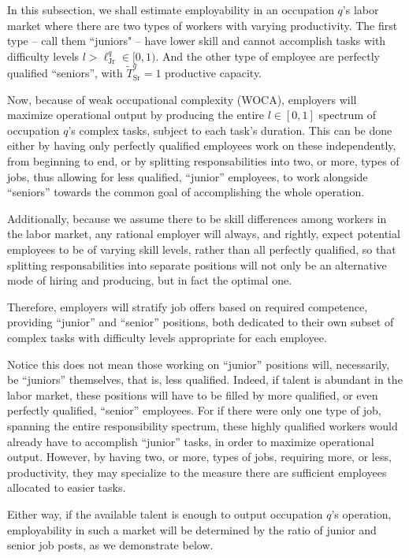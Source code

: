 \documentclass[hidelinks, nonatbib]{elsarticle}
\begin{document}
In this subsection, we shall estimate employability in an occupation $q$'s labor market where there are two types of workers with varying productivity. The first type -- call them ``juniors" -- have lower skill and cannot accomplish tasks with difficulty levels $l > \ell_{\text{Jr}}^{q} \in [0,1)$. And the other type of employee are perfectly qualified ``seniors'', with $\tilde{T}_{\text{Sr}}^{q} = 1$ productive capacity.

Now, because of weak occupational complexity (WOCA), employers will maximize operational output by producing the entire $l \in [0,1]$ spectrum of occupation $q$'s complex tasks, subject to each task's duration. This can be done either by having only perfectly qualified employees work on these independently, from beginning to end, or by splitting responsabilities into two, or more, types of jobs, thus allowing for less qualified, ``junior'' employees, to work alongside ``seniors'' towards the common goal of accomplishing the whole operation.

Additionally, because we assume there to be skill differences among workers in the labor market, any rational employer will always, and rightly, expect potential employees to be of varying skill levels, rather than all perfectly qualified, so that splitting responsabilities into separate positions will not only be an alternative mode of hiring and producing, but in fact the optimal one.

Therefore, employers will stratify job offers based on required competence, providing ``junior'' and ``senior'' positions, both dedicated to their own subset of complex tasks with difficulty levels appropriate for each employee.

Notice this does not mean those working on ``junior'' positions will, necessarily, be ``juniors'' themselves, that is, less qualified. Indeed, if talent is abundant in the labor market, these positions will have to be filled by more qualified, or even perfectly qualified, ``senior'' employees. For if there were only one type of job, spanning the entire responsibility spectrum, these highly qualified workers would already have to accomplish ``junior'' tasks, in order to maximize operational output. However, by having two, or more, types of jobs, requiring more, or less, productivity, they may specialize to the measure there are sufficient employees allocated to easier tasks.

Either way, if the available talent is enough to output occupation $q$'s operation, employability in such a market will be determined by the ratio of junior and senior job posts, as we demonstrate below.
\end{document}
